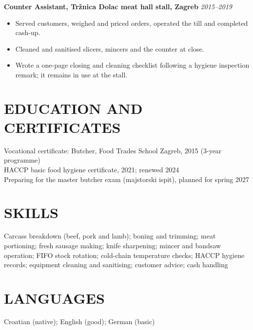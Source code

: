 \documentclass[11pt,a4paper]{article}
\begin{document}
\noindent\textbf{Counter Assistant, Tržnica Dolac meat hall stall, Zagreb} \hfill \textit{2015--2019}
\begin{itemize}
\item Served customers, weighed and priced orders, operated the till and completed cash-up.
\item Cleaned and sanitised slicers, mincers and the counter at close.
\item Wrote a one-page closing and cleaning checklist following a hygiene inspection remark; it remains in use at the stall.
\end{itemize}

\section*{EDUCATION AND CERTIFICATES}
Vocational certificate: Butcher, Food Trades School Zagreb, 2015 (3-year programme)\\
HACCP basic food hygiene certificate, 2021; renewed 2024\\
Preparing for the master butcher exam (majstorski ispit), planned for spring 2027

\section*{SKILLS}
Carcass breakdown (beef, pork and lamb); boning and trimming; meat portioning; fresh sausage making; knife sharpening; mincer and bandsaw operation; FIFO stock rotation; cold-chain temperature checks; HACCP hygiene records; equipment cleaning and sanitising; customer advice; cash handling

\section*{LANGUAGES}
Croatian (native); English (good); German (basic)
\end{document}
